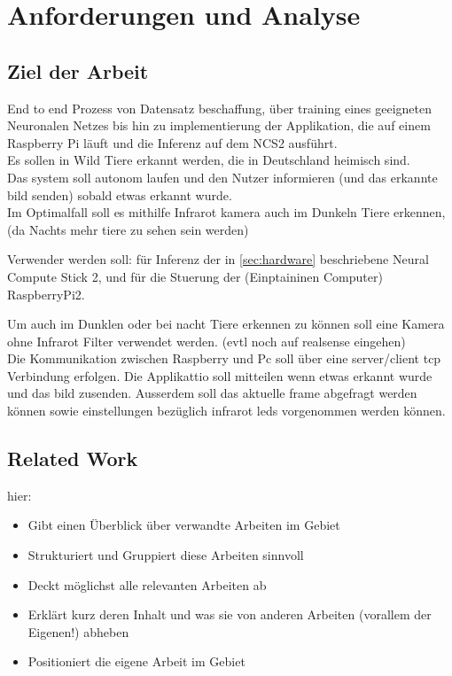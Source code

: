 \chapter{Anforderungen und Analyse}\label{kap:anforderunganalyse}

\section{Ziel der Arbeit}\label{sec:zielderarbeit}

End to end Prozess von Datensatz beschaffung, über training eines geeigneten Neuronalen 
Netzes bis hin zu implementierung der Applikation, 
die auf einem Raspberry Pi läuft und die Inferenz auf dem NCS2 ausführt.
\\

Es sollen in Wild Tiere erkannt werden, die in Deutschland heimisch sind.\\
Das system soll autonom laufen und den Nutzer informieren (und das erkannte bild senden) 
sobald etwas erkannt wurde.\\
Im Optimalfall soll es mithilfe Infrarot kamera auch im Dunkeln Tiere erkennen, 
(da Nachts mehr tiere zu sehen sein werden)


Verwender werden soll: für Inferenz der in \ref{sec:hardware} beschriebene
Neural Compute Stick 2, und für die Stuerung der (Einptaininen Computer) 
RaspberryPi2. 

Um auch im Dunklen oder bei nacht Tiere erkennen zu können soll eine Kamera ohne
Infrarot Filter verwendet werden. (evtl noch auf realsense eingehen)
\\
Die Kommunikation zwischen Raspberry und Pc soll über eine server/client tcp 
Verbindung erfolgen. Die Applikattio soll mitteilen wenn etwas erkannt wurde 
und das bild zusenden. Ausserdem soll das aktuelle frame abgefragt werden können
sowie einstellungen bezüglich infrarot leds vorgenommen werden können.






\section{Related Work}\label{sec:related_work}

hier:
\begin{itemize}
    \item Gibt einen Überblick über verwandte Arbeiten im Gebiet
    \item Strukturiert und Gruppiert diese Arbeiten sinnvoll
    \item Deckt möglichst alle relevanten Arbeiten ab
    \item Erklärt kurz deren Inhalt und was sie von anderen Arbeiten (vorallem der Eigenen!) abheben
    \item Positioniert die eigene Arbeit im Gebiet
\end{itemize}

